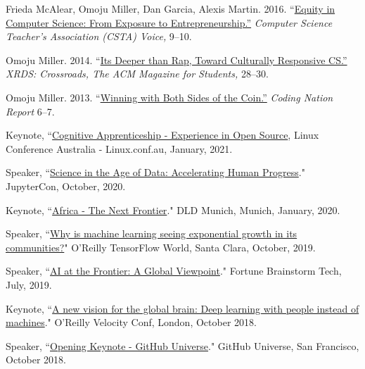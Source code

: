 \documentclass[11pt,article,oneside]{memoir}
\begin{document}
\ind Frieda McAlear, Omoju Miller, Dan Garcia, Alexis Martin. 2016. ``\href{http://www.csta.acm.org/Communications/sub/CSTAVoice_Files/csta_voice_01_2016.pdf}{Equity in Computer Science: From Exposure to Entrepreneurship.''} \emph{Computer Science Teacher's Association (CSTA) Voice, } 9--10.

\ind Omoju Miller. 2014. ``\href{http://dl.acm.org/citation.cfm?id=2604994}{Its Deeper than Rap, Toward Culturally Responsive CS.'' }\emph{XRDS: Crossroads,  The ACM Magazine for Students, } 28--30.

\ind Omoju Miller. 2013. ``\href{http://kaporcenter.org/wp-content/uploads/2013/10/Kapor_CodingLandscape_R3.pdf}{Winning with Both Sides of the Coin.''} \emph{Coding Nation Report} 6--7.

 \bigskip


\medskip

\ind Keynote, ``\href{https://www.youtube.com/watch?v=JShvXcL66NQ}{Cognitive Apprenticeship - Experience in Open Source}, Linux Conference Australia - Linux.conf.au, January, 2021.

\ind Speaker, ``\href{https://www.youtube.com/watch?v=JHS9yQMUzb0}{Science in the Age of Data: Accelerating Human Progress}." JupyterCon, October, 2020.

\ind Keynote, ``\href{https://www.youtube.com/watch?v=uC5ZRaK8Ebc}{Africa - The Next Frontier}." DLD Munich, Munich, January, 2020.

\ind Speaker, ``\href{https://www.oreilly.com/library/view/oreilly-tensorflow-world/0636920333111/video328051.html}{Why is machine learning seeing exponential growth in its communities?}" O'Reilly TensorFlow World, Santa Clara, October, 2019.

\ind Speaker, ``\href{https://www.youtube.com/watch?v=NPk-y_tH7JY}{AI at the Frontier: A Global Viewpoint}." Fortune Brainstorm Tech, July, 2019.

\ind Keynote, ``\href{https://youtu.be/Teq3pa1L7Tg}{A new vision for the global brain: Deep learning with people instead of machines}." O'Reilly Velocity Conf, London, October 2018.

\ind Speaker, ``\href{https://www.youtube.com/watch?v=vB5nTx5fUXM}{Opening Keynote - GitHub Universe}." GitHub Universe, San Francisco, October 2018.
\end{document}
